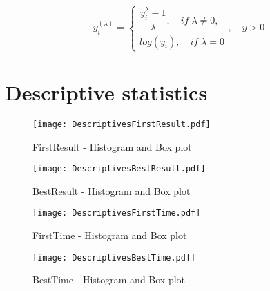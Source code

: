 \begin{equation}
y_i^{(\lambda)} = \begin{cases}
\dfrac{y_i^{\lambda}-1}{\lambda}, \quad if\;\lambda \neq 0, \\ 
log(y_i), \quad if\;\lambda = 0
\end{cases}, \quad y > 0 
\end{equation}


\section{Descriptive statistics}
		\label{Appendix-Descriptive}
		
\begin{figure}[htbp] %
\begin{center} 
\texttt{[image: DescriptivesFirstResult.pdf]}
  \caption{FirstResult - Histogram and Box plot}
    \label{DistributionFirstResult} 
\end{center}
\end{figure}

\begin{figure}[htbp] %
\begin{center} 
\texttt{[image: DescriptivesBestResult.pdf]}
  \caption{BestResult - Histogram and Box plot}
    \label{DistributionBestResult} 
\end{center}
\end{figure}

\begin{figure}[htbp] %
\begin{center} 
\texttt{[image: DescriptivesFirstTime.pdf]}
  \caption{FirstTime - Histogram and Box plot}
    \label{DistributionFirstTime} 
\end{center}
\end{figure}
\begin{figure}[htbp] %
\begin{center} 
\texttt{[image: DescriptivesBestTime.pdf]}
  \caption{BestTime - Histogram and Box plot}
    \label{DistributionBestTime} 
\end{center}
\end{figure}

